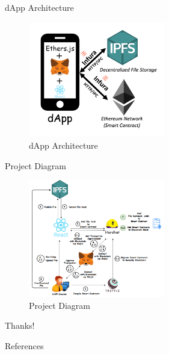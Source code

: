 \documentclass[aspectratio=169,usenames,dvipsnames,pdftex]{beamer}
\begin{document}
  \begin{frame}{dApp Architecture}
    \begin{figure}
      \includegraphics[width=0.53\textwidth]{dapp-arch.png}
      \caption{dApp Architecture}
    \end{figure}
  \end{frame}

  \begin{frame}{Project Diagram}
    \begin{figure}
      \includegraphics[width=0.53\textwidth]{project-diagram.png}
      \caption{Project Diagram}
    \end{figure}
  \end{frame}

	\begin{frame}[standout]
		Thanks!
	\end{frame}

	\begin{frame}[allowframebreaks]{References}
    \nocite{*}
    
		
	\end{frame}
\end{document}
